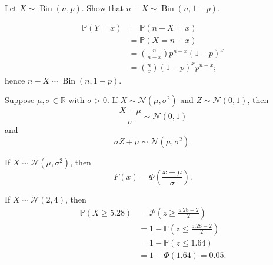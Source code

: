 \begin{example}
    Let $X \sim \operatorname{Bin}(n, p)$. Show that $n - X \sim \operatorname{Bin}(n, 1 - p)$.
\end{example}

\begin{solution}
    \begin{align*}
        \mathbb P(Y = x) &= \mathbb P(n - X = x) \\
        &= \mathbb P(X = n - x) \\
        &= \binom{n}{n - x} p^{n - x} (1 - p)^x \\
        &= \binom{n}{x} (1-p)^x p^{n - x};
    \end{align*}
    hence $n - X \sim \operatorname{Bin}(n, 1 - p)$.
\end{solution}

\begin{theorem}
    Suppose $\mu, \sigma \in \mathbb R$ with $\sigma > 0 $. If $X \sim \mathcal N(\mu, \sigma^2)$ and $Z \sim \mathcal N(0, 1)$, then \[ \frac{X - \mu}{\sigma} \sim \mathcal N(0, 1) \] and \[ \sigma Z + \mu \sim \mathcal N(\mu, \sigma^2). \]
\end{theorem}

\begin{corollary}
    If $X \sim \mathcal N(\mu, \sigma^2)$, then \[ F(x) = \Phi\left(\frac{x - \mu}{\sigma}\right). \]
\end{corollary}

\begin{example}
    If $X \sim \mathcal N(2, 4)$, then 
    \begin{align*}
        \mathbb P(X \geq 5.28) &= \mathcal P\left(z \geq \frac{5.28 - 2}{2}\right) \\
        &= 1 - \mathbb P\left(z \leq \frac{5.28 - 2}{2}\right) \\
        &= 1 - \mathbb P(z \leq 1.64) \\
        &= 1 - \Phi(1.64) = 0.05.
    \end{align*}
\end{example}
